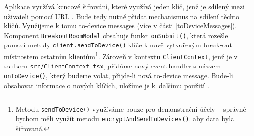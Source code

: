Aplikace využívá koncové šifrování, které využívá jeden klíč, jenž je sdílený
mezi uživateli pomocí URL \parencite{GitHub-ElementCall-CompleteSPAE2EEWork}.
Bude tedy nutné přidat mechanismus na sdílení těchto klíčů. Využijeme k tomu
to-device messages (více v části \ref{toDeviceMessages}). Komponent
\texttt{BreakoutRoomModal} obsahuje funkci
\texttt{onSubmit()}, která rozešle pomocí metody
\texttt{client.sendToDevice()} klíče k nově vytvořeným break-out
místnostem ostatním klientům\footnote{Metodu
    \texttt{sendToDevice()} využíváme pouze pro demonstrační účely
    -- správně bychom měli využít metodu
    \texttt{encryptAndSendToDevices()}, aby data byla šifrovaná.}.
Zároveň v kontextu \texttt{ClientContext}, jenž je v souboru
\texttt{src/ClientContext.tsx}, přidáme nový event handler s názvem
\texttt{onToDevice()}, který budeme volat, přijde-li nová
to-device message. Bude-li obsahovat informace o nových klíčích, uložíme je
k~dalšímu použití \parencite{GitHub-ElementCall-BreakoutRooms}.
